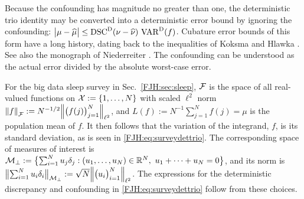 \documentclass[graybox,footinfo]{svmult}
\DeclareMathOperator{\disc}{DSC}
\DeclareMathOperator{\Var}{VAR}
\begin{document}
Because the confounding has magnitude no greater than one, the deterministic trio 
identity may be converted into a deterministic error bound by 
ignoring the confounding:  $\abs{\mu - \hmu}  \le \disc^\Dt(\nu - \hnu) \, \Var^{\Dt}(f)$.  
Cubature error bounds of this form have a long history, dating back to the inequalities of 
Koksma \cite{Kok42} and Hlawka \cite{Hla61}. See also the monograph of Niederreiter 
\cite{Nie92}.  The confounding can be understood as the actual error divided by the 
absolute worst-case error.

For the big data sleep survey in Sec.\ \ref{FJH:sec:sleep}, $\mathcal{F}$ is the space of all 
real-valued functions on $\mathcal{X} := \{1, \ldots, N\}$ with scaled $\ell^2$ norm 
$\left \lVert f \right \rVert_{\mathcal{F}} 
:= N^{-1/2} \Bigl \lVert \bigl(f(j)\bigr)_{j=1}^N \Bigr \rVert_{\ell^2}$, and $L(f) := N^{-1}\sum_{j=1}^N f(j) 
= 
\mu $ is the population mean of $f$. It then follows that the variation of 
the integrand, $f$, is its standard deviation, as is seen in \eqref{FJH:eq:surveydettrio}.
The corresponding space of measures of interest is $\mathcal{M}_\bot := \bigl \{ \sum_{i=1}^N u_j 
\delta_{j} : (u_1, \ldots, u_N) \in {\mathbb{R}}^N,\ u_1 + \cdots + u_N= 0 \bigr \}$, and its norm is 
$\bigl \lVert \sum_{i=1}^N u_i \delta_{i} \bigr \rVert_{\mathcal{M}_\bot} : = 
	\sqrt{N} \Bigl \lVert \bigl(u_i\bigr)_{i=1}^N \Bigr \rVert_{\ell^2}$.   The expressions for the 
	deterministic 
	discrepancy and confounding in \eqref{FJH:eq:surveydettrio} follow from these 
	choices.
\end{document}
